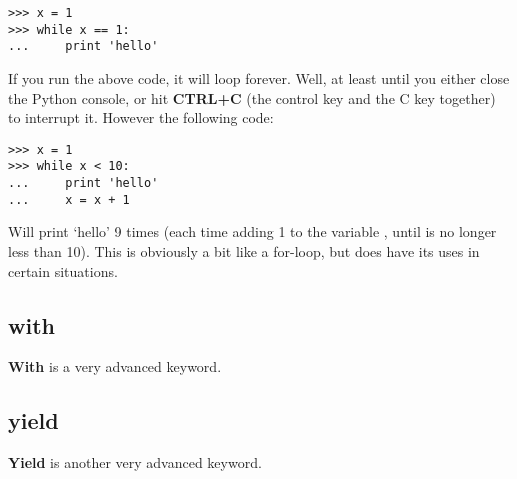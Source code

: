 \begin{listingignore}
\begin{verbatim}
>>> x = 1
>>> while x == 1:
...     print 'hello'
\end{verbatim}
\end{listingignore}

If you run the above code, it will loop forever.  Well, at least until you either close the Python console, or hit \textbf{CTRL+C} (the control key and the C key together) to interrupt it. However the following code:

\begin{listing}
\begin{verbatim}
>>> x = 1
>>> while x < 10:
...     print 'hello'
...     x = x + 1
\end{verbatim}
\end{listing}

Will print `hello' 9 times (each time adding 1 to the variable , until  is no longer less than 10). This is obviously a bit like a for-loop, but does have its uses in certain situations.

\subsection*{with}

\textbf{With} is a very advanced keyword.

\subsection*{yield}
\textbf{Yield} is another very advanced keyword.

\newpage